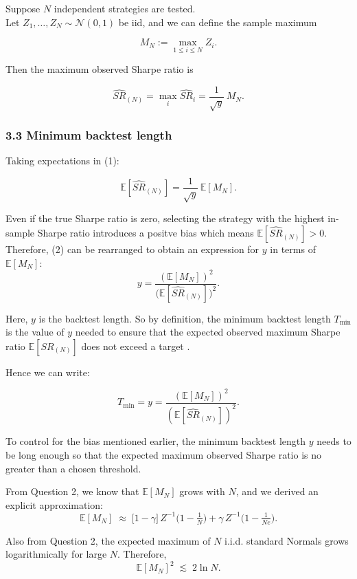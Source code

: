 \documentclass[
  12pt,
]{article}
\begin{document}
Suppose \(N\) independent strategies are tested.\\
Let \(Z_1,\dots,Z_N \sim \mathcal{N}(0,1)\) be iid, and we can define
the sample maximum

\[
M_N := \max_{1 \le i \le N} Z_i.
\]

Then the maximum observed Sharpe ratio is

\[
\widehat{SR}_{(N)} = \max_{i} \widehat{SR}_i = \frac{1}{\sqrt{y}}\,M_N. \tag{1}
\]

\subsubsection{3.3 Minimum backtest
length}\label{minimum-backtest-length}

Taking expectations in (1):

\[
\mathbb{E}[\widehat{SR}_{(N)}] = \frac{1}{\sqrt{y}}\,\mathbb{E}[M_N]. \tag{2}
\]

Even if the true Sharpe ratio is zero, selecting the strategy with the
highest in-sample Sharpe ratio introduces a positve bias which means
\(\mathbb{E}[\widehat{SR}_{(N)}] > 0\). Therefore, (2) can be rearranged
to obtain an expression for \(y\) in terms of \(\mathbb{E}[M_N]\): \[
y = \frac{(\mathbb{E}[M_N])^2}{\big(\mathbb{E}[\widehat{SR}_{(N)}]\big)^2}. \tag{3}
\]

Here, \(y\) is the backtest length. So by definition, the minimum
backtest length \(T_{\min}\) is the value of \(y\) needed to ensure that
the expected observed maximum Sharpe ratio
\(\mathbb{E}[\widehat{SR}_{(N)}]\) does not exceed a target .

Hence we can write:

\[
T_{\min} = y = \frac{(\mathbb{E}[M_N])^2}{(\mathbb{E}[\widehat{SR}_{(N)}])^2}.
\]

To control for the bias mentioned earlier, the minimum backtest length
\(y\) needs to be long enough so that the expected maximum observed
Sharpe ratio is no greater than a chosen threshold.

From Question 2, we know that \(\mathbb{E}[M_N]\) grows with \(N\), and
we derived an explicit approximation: \[
\mathbb{E}[M_N] \;\approx\; \big[1 - \gamma\big]\,Z^{-1}\!\Big(1-\tfrac{1}{N}\Big)
+ \gamma\,Z^{-1}\!\Big(1-\tfrac{1}{Ne}\Big). \tag{4}
\]

Also from Question 2, the expected maximum of \(N\) i.i.d. standard
Normals grows logarithmically for large \(N\). Therefore, \[
\mathbb{E}[M_N]^2 \;\lesssim\; 2\ln N. \tag{5}
\]
\end{document}

